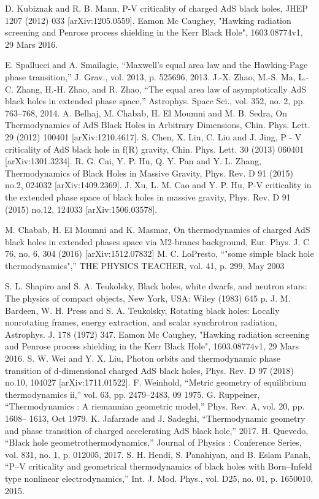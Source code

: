 \documentclass[12pt,  a4paper, openright]{report} %
\begin{document}
\begin{thebibliography}{99}
 D. Kubiznak and R. B. Mann, P-V criticality of charged AdS black holes, JHEP 1207 (2012) 033
[arXiv:1205.0559].
 Eamon Mc Caughey, "Hawking radiation screening and Penrose process shielding in the Kerr Black Hole", 1603.08774v1, 29 Mars 2016.

 E. Spallucci and A. Smailagic, “Maxwell’s equal area law and the Hawking-Page phase transition,”
J. Grav., vol. 2013, p. 525696, 2013.
 J.-X. Zhao, M.-S. Ma, L.-C. Zhang, H.-H. Zhao, and R. Zhao, “The equal area law of asymptotically
AdS black holes in extended phase space,” Astrophys. Space Sci., vol. 352, no. 2, pp. 763–768, 2014.
 A. Belhaj, M. Chabab, H. El Moumni and M. B. Sedra, On Thermodynamics of AdS Black Holes in
Arbitrary Dimensions, Chin. Phys. Lett. 29 (2012) 100401 [arXiv:1210.4617].
  S. Chen, X. Liu, C. Liu and J. Jing, P - V criticality of AdS black hole in f(R) gravity, Chin. Phys.
Lett. 30 (2013) 060401 [arXiv:1301.3234].
 R. G. Cai, Y. P. Hu, Q. Y. Pan and Y. L. Zhang, Thermodynamics of Black Holes in Massive Gravity,
Phys. Rev. D 91 (2015) no.2, 024032 [arXiv:1409.2369].
 J. Xu, L. M. Cao and Y. P. Hu, P-V criticality in the extended phase space of black holes in massive
gravity, Phys. Rev. D 91 (2015) no.12, 124033 [arXiv:1506.03578].

 M. Chabab, H. El Moumni and K. Masmar, On thermodynamics of charged AdS black holes
in extended phases space via M2-branes background, Eur. Phys. J. C 76, no. 6, 304 (2016)
[arXiv:1512.07832]
 M. C. LoPresto, “"some simple black hole thermodynamics",” THE PHYSICS TEACHER, vol. 41,
p. 299, May 2003


  S. L. Shapiro and S. A. Teukolsky, Black holes, white dwarfs, and neutron stars: The physics of
compact objects, New York, USA: Wiley (1983) 645 p.
 J. M. Bardeen, W. H. Press and S. A. Teukolsky, Rotating black holes: Locally nonrotating frames,
energy extraction, and scalar synchrotron radiation, Astrophys. J. 178 (1972) 347. 
 Eamon Mc Caughey, "Hawking radiation screening and Penrose process shielding
in the Kerr Black Hole", 1603.08774v1, 29 Mars 2016.
 S. W. Wei and Y. X. Liu, Photon orbits and thermodynamic phase transition of d-dimensional charged
AdS black holes, Phys. Rev. D 97 (2018) no.10, 104027 [arXiv:1711.01522].
 F. Weinhold, “Metric geometry of equilibrium thermodynamics ii,” vol. 63, pp. 2479–2483, 09 1975.
 G. Ruppeiner, “Thermodynamics : A riemannian geometric model,” Phys. Rev. A, vol. 20, pp. 1608–
1613, Oct 1979.
 K. Jafarzade and J. Sadeghi, “Thermodynamic geometry and phase transition of charged accelerating
AdS black hole,” 2017.
 H. Quevedo, “Black hole geometrothermodynamics,” Journal of Physics : Conference Series, vol. 831,
no. 1, p. 012005, 2017.
 S. H. Hendi, S. Panahiyan, and B. Eslam Panah, “P–V criticality and geometrical thermodynamics
of black holes with Born–Infeld type nonlinear electrodynamics,” Int. J. Mod. Phys., vol. D25, no. 01,
p. 1650010, 2015.
\end{thebibliography}
\end{document}
